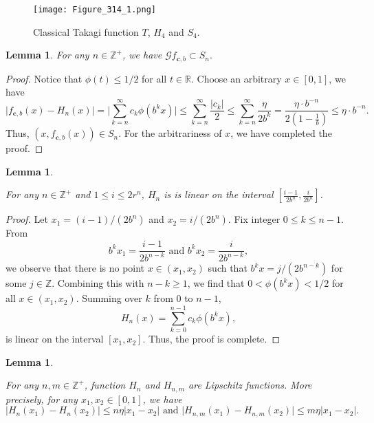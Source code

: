 \documentclass{amsart}
\newtheorem{lem}[thm]{Lemma}
\theoremstyle{definition}
\theoremstyle{remark}
\numberwithin{equation}{section}
\newcommand{\Z}{{\mathbb Z}}
\def\R{\mathbb{R}}
\def\g{\mathcal{G}}
\def\bfc{\mathbf{c}}
\begin{document}
\begin{figure}[htbp]
\centering
\texttt{[image: Figure\_314\_1.png]}
\caption{Classical Takagi function $T$, $H_4$ and $S_{4}$.}
\end{figure}


\begin{lem}\label{lem:cover}
For any $n \in \mathbb{Z}^+$, we have 
$
	\g f_{\bfc,b} \subset S_{n}.
$ 


\end{lem}
\begin{proof}
Notice that $\phi(t) \leq 1/2$ for all $ t \in \R$.
Choose an arbitrary $x \in [0,1]$,
we have
$$ 
	\big|f_{\bfc,b}(x)-H_{n}(x)\big|
	=\bigg|\sum_{k=n}^\infty  c_k \phi(b^k x)\bigg|
	\leq \sum_{k=n}^\infty \frac{|c_k|}{2}
	\leq \sum_{k=n}^\infty \frac{\eta}{2b^k}
	= \frac{\eta \cdot b^{-n}}{2(1-\frac{1}{b})}
	 \leq \eta \cdot  b^{-n}. 
$$
Thus, $(x,f_{\bfc,b}(x)) \in S_{n}$.
For the arbitrariness of $x$, we have completed the proof.
\end{proof}












\begin{lem}\label{lem:linear}

For any $n \in \Z^+$ and $1 \leq i \leq 2r^n$, 
$H_n$ is  is linear on the interval $[\frac{i-1}{2 b^n} , \frac{i}{2 b^n} ]$.




\end{lem}

\begin{proof}

Let
$x_1=( i-1)/(2b^n)$ and $x_2=i/(2b^n)$.
Fix integer $0 \leq k \leq n-1$.
From
\[
  b^k x_1=\frac{i-1}{2b^{n-k}} \mbox{ and } b^k x_2=\frac{i}{2b^{n-k}},
\]
we observe that there is no point $x \in (x_1,x_2)$ such that $b^k x=j/(2b^{n-k})$ for some $j\in \Z$. 
Combining this with $n-k \geq 1$, we find that $0<\phi(b^k x) < 1/2$ for all $x\in (x_1,x_2)$. 
Summing over $k$ from $0$ to $n-1$,
$$
	H_n(x)=\sum_{k=0}^{n-1} c_k \phi(b^k x),
$$
is linear on the interval 
 $[x_1,x_2]$.  
Thus, the proof is complete.
\end{proof}





\begin{lem}\label{lem:lips}

For any $  n,m \in \Z^+$, function $H_{n}$ and $H_{n,m}$ are Lipschitz functions. More precisely, for any $x_1,x_2 \in [0,1]$, we have
$$
	\big|H_{n}(x_1)-H_{n}(x_2)\big|\leq n \eta |x_1-x_2|
	 \mbox{ and } 
	\big|H_{n,m}(x_1)-H_{n,m}(x_2)\big|\leq m \eta |x_1-x_2|.
$$
\end{lem}
\end{document}
